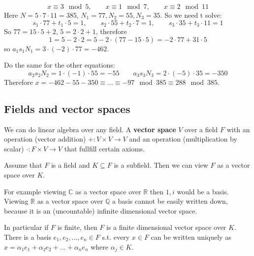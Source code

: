 \documentclass[english]{lbscript}
\begin{document}
\begin{example}{}{}
  \begin{equation}
    \label{eq:119}
    x≡3 \mod 5, \quad\quad  x≡1 \mod 7, \quad\quad x≡2 \mod 11
  \end{equation}
  Here \(N=5⋅7⋅11=385\), \(N_1=77, N_2=55, N_3=35\). So we need t solve:
  \begin{equation}
    \label{eq:125}
    s_1⋅77+t_1⋅5=1,\quad\quad s_2⋅55+t_2⋅7=1, \qquad s_3⋅35+t_3⋅11=1
  \end{equation}
  So \(77=15⋅5+2\), \(5=2⋅2+1\), therefore
  \begin{equation}
    \label{eq:126}
    1= 5 - 2⋅2= 5-2⋅(77-15⋅5)= - 2⋅77+31⋅5
  \end{equation}
  so \(a_1s_1N_1=3⋅(-2)⋅77=-462\).

  Do the same for the other equations:
  \begin{equation*}
    a_2s_2N_2=1⋅(-1)⋅55=-55 \quad \quad a_3s_3N_3 = 2⋅(-5)⋅35 = -350
  \end{equation*}
  Therefore \(x=-462-55-350 ≡ \dots ≡ -97 \mod 385 ≡ 288 \mod 385\).
\end{example}


\subsection{Fields and vector spaces}
\label{sec:fields-vector-spaces}

We can do linear algebra over any field. A \textbf{vector space} \(V\) over a field \(F\) with an operation (vector addition) \(+:V×V→V\) and an operation (multiplication by scalar) \(⋅:F×V→V\) that fullfill certain axioms.

\begin{example}{}{}
  Assume that \(F\) is a field and \(K⊆F\) is a subfield. Then we can view \(F\) as a vector space over \(K\).
\end{example}
\begin{example}{}{}
  For example viewing \(ℂ\) as a vector space over \(ℝ\) then \(1, i\) would be a basis. Viewing \(ℝ\) as a vector space over \(ℚ\) a basis cannot be easily written down, because it is an (uncountable) infinite dimensional vector space.
\end{example}

In particular if \(F\) is finite, then \(F\) is a finite dimensional vector space over \(K\). There is a basis \(e_1,e_2,\dots, e_n∈F\) s.t. every \(x∈F\) can be written uniquely as \(x=𝛼_{1}e_1+𝛼₂e_2+\dots+𝛼_{n}e_n\) where \(𝛼_{j}∈K\).
\end{document}
